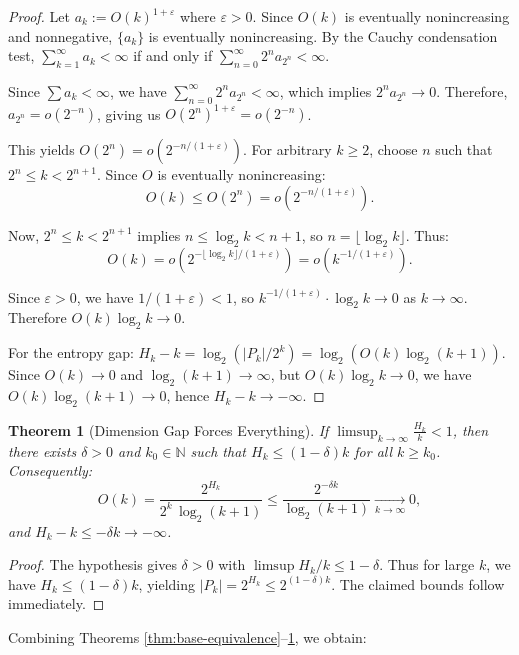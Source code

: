 \documentclass[11pt]{article}
\newtheorem{theorem}{Theorem}
\theoremstyle{definition}
\newcommand{\bbN}{\mathbb{N}}
\newcommand{\eps}{\varepsilon}
\begin{document}
\begin{proof}
Let $a_k:=O(k)^{1+\eps}$ where $\eps > 0$. Since $O(k)$ is eventually nonincreasing and nonnegative, $\{a_k\}$ is eventually nonincreasing. By the Cauchy condensation test, $\sum_{k=1}^\infty a_k < \infty$ if and only if $\sum_{n=0}^\infty 2^n a_{2^n} < \infty$.

Since $\sum a_k < \infty$, we have $\sum_{n=0}^\infty 2^n a_{2^n} < \infty$, which implies $2^n a_{2^n} \to 0$. Therefore, $a_{2^n} = o(2^{-n})$, giving us $O(2^n)^{1+\eps} = o(2^{-n})$.

This yields $O(2^n) = o(2^{-n/(1+\eps)})$. For arbitrary $k \geq 2$, choose $n$ such that $2^n \leq k < 2^{n+1}$. Since $O$ is eventually nonincreasing:
$$O(k) \leq O(2^n) = o(2^{-n/(1+\eps)}).$$

Now, $2^n \leq k < 2^{n+1}$ implies $n \leq \log_2 k < n+1$, so $n = \lfloor \log_2 k \rfloor$. Thus:
$$O(k) = o\left(2^{-\lfloor \log_2 k \rfloor/(1+\eps)}\right) = o\left(k^{-1/(1+\eps)}\right).$$

Since $\eps > 0$, we have $1/(1+\eps) < 1$, so $k^{-1/(1+\eps)} \cdot \log_2 k \to 0$ as $k \to \infty$. Therefore $O(k)\log_2 k \to 0$.

For the entropy gap: $H_k - k = \log_2(|P_k|/2^k) = \log_2(O(k)\log_2(k+1))$. Since $O(k) \to 0$ and $\log_2(k+1) \to \infty$, but $O(k)\log_2 k \to 0$, we have $O(k)\log_2(k+1) \to 0$, hence $H_k - k \to -\infty$.
\end{proof}

\begin{theorem}[Dimension Gap Forces Everything]\label{thm:dimension-gap}
If $\displaystyle \limsup_{k\to\infty}\frac{H_k}{k}<1$, then there exists $\delta>0$ and $k_0 \in \bbN$ such that $H_k\le (1-\delta)k$ for all $k\ge k_0$. Consequently:
\begin{equation}
O(k)=\frac{2^{H_k}}{2^k\,\log_2(k+1)}\le\frac{2^{-\delta k}}{\log_2(k+1)}\xrightarrow[k\to\infty]{}0,
\end{equation}
and $H_k-k\le -\delta k\to -\infty$.
\end{theorem}

\begin{proof}
The hypothesis gives $\delta>0$ with $\limsup H_k/k\le 1-\delta$. Thus for large $k$, we have $H_k\le (1-\delta)k$, yielding $|P_k|=2^{H_k}\le 2^{(1-\delta)k}$. The claimed bounds follow immediately.
\end{proof}

Combining Theorems \ref{thm:base-equivalence}--\ref{thm:dimension-gap}, we obtain:
\end{document}
